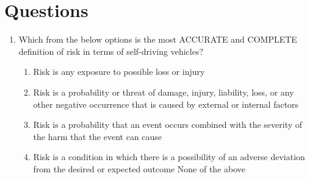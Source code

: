  \section{Questions}
 \label{questions_safety_for_self_driving_cars}

\begin{enumerate}
\item Which from the below options is the most ACCURATE and COMPLETE definition of risk in terms of self-driving vehicles?
	\begin{enumerate}
		\item Risk is any exposure to possible loss or injury
		\item Risk is a probability or threat of damage, injury, liability, loss, or any other negative occurrence that is caused by external or internal factors
		\item Risk is a probability that an event occurs combined with the severity of the harm that the event can cause
		\item Risk is a condition in which there is a possibility of an adverse deviation from the desired or expected outcome
		\itme None of the above
	\end{enumerate}
	

\end{enumerate}
